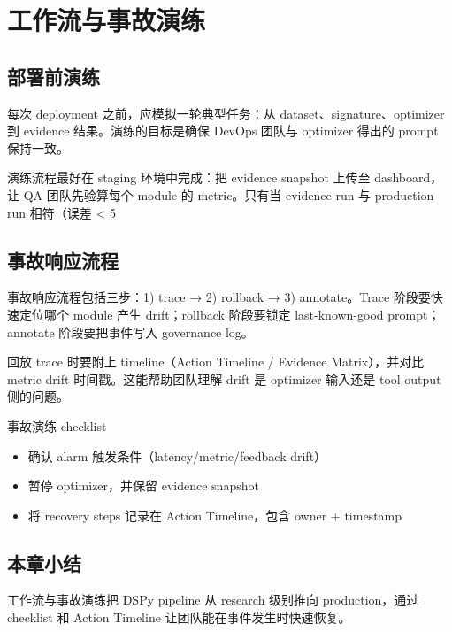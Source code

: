 \section{工作流与事故演练}

\subsection{部署前演练}

每次 deployment 之前，应模拟一轮典型任务：从 dataset、signature、optimizer 到 evidence 结果。演练的目标是确保 DevOps 团队与 optimizer 得出的 prompt 保持一致。

演练流程最好在 staging 环境中完成：把 evidence snapshot 上传至 dashboard，让 QA 团队先验算每个 module 的 metric。只有当 evidence run 与 production run 相符（误差 < 5%

\subsection{事故响应流程}

事故响应流程包括三步：1) trace → 2) rollback → 3) annotate。Trace 阶段要快速定位哪个 module 产生 drift；rollback 阶段要锁定 last-known-good prompt；annotate 阶段要把事件写入 governance log。

回放 trace 时要附上 timeline（Action Timeline / Evidence Matrix），并对比 metric drift 时间戳。这能帮助团队理解 drift 是 optimizer 输入还是 tool output 侧的问题。

\begin{importantbox}{事故演练 checklist}
\begin{itemize}
    \item 确认 alarm 触发条件（latency/metric/feedback drift）
    \item 暂停 optimizer，并保留 evidence snapshot
    \item 将 recovery steps 记录在 Action Timeline，包含 owner + timestamp
\end{itemize}
\end{importantbox}

\subsection{本章小结}

工作流与事故演练把 DSPy pipeline 从 research 级别推向 production，通过 checklist 和 Action Timeline 让团队能在事件发生时快速恢复。

